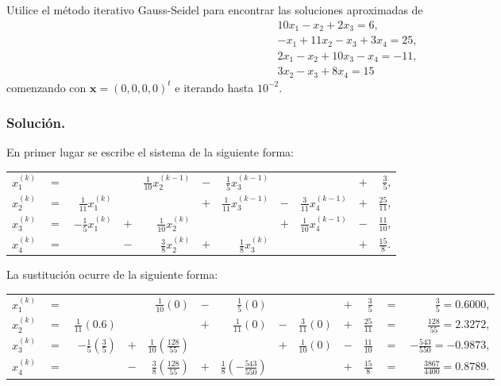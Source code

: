 \begin{exerciseT}
Utilice el método iterativo Gauss-Seidel para encontrar las soluciones aproximadas de
$$\begin{array}{r}
    10x_1 - x_2 + 2x_3 = 6,\\
    -x_1 + 11x_2 - x_3 + 3x_4 = 25,\\
    2x_1 - x_2 + 10x_3 - x_4 = -11,\\
    3x_2 - x_3 + 8x_4 = 15
  \end{array}$$
comenzando con $\textbf{x}=(0,0,0,0)^t$ e iterando hasta $10^{-2}$.

\subsubsection*{Solución.}
En primer lugar se escribe el sistema de la siguiente forma:
\begin{table}[H]
	\centering
	\begin{tabular}{lcrcrcrcrcr}
    	$x_1^{(k)}$ & $=$ &  &  & $\frac{1}{10}x_2^{(k-1)}$ & $-$ & $\frac{1}{5}x_3^{(k-1)}$ & & & $+$ & $\frac{3}{5}$,\\
	    $x_2^{(k)}$ & $=$ & $\frac{1}{11}x_1^{(k)}$ &  &  & $+$ & $\frac{1}{11}x_3^{(k-1)}$ & $-$ & $\frac{3}{11}x_4^{(k-1)}$ & $+$ & $\frac{25}{11}$,\\
    	$x_3^{(k)}$ & $=$ & $-\frac{1}{5}x_1^{(k)}$ & $+$ & $\frac{1}{10}x_2^{(k)}$ & & & $+$ & $\frac{1}{10}x_4^{(k-1)}$ & $-$ & $\frac{11}{10}$,\\
	    $x_4^{(k)}$ & $=$ &  & $-$ & $\frac{3}{8}x_2^{(k)}$ & $+$ & $\frac{1}{8}x_3^{(k)}$ & & & $+$ & $\frac{15}{8}$.\\
  	\end{tabular}
\end{table}

La sustitución ocurre de la siguiente forma:
\begin{table}[H]
	\centering
	\begin{tabular}{lcrcrcrcrcrcr}
    	$x_1^{(k)}$ & $=$ &  &  & $\frac{1}{10}(0)$ & $-$ & $\frac{1}{5}(0)$ & & & $+$ & $\frac{3}{5}$ & $=$ & $\frac{3}{5} = 0.6000$,\\
    	$x_2^{(k)}$ & $=$ & $\frac{1}{11}(0.6)$ &  &  & $+$ & $\frac{1}{11}(0)$ & $-$ & $\frac{3}{11}(0)$ & $+$ & $\frac{25}{11}$ & $=$ 
    	& $\frac{128}{55}=2.3272$,\\
	    $x_3^{(k)}$ & $=$ & $-\frac{1}{5}(\frac{3}{5})$ & $+$ & $\frac{1}{10}(\frac{128}{55})$ & & & $+$ & $\frac{1}{10}(0)$ & $-$ 
	    & $\frac{11}{10}$ & $=$ & $-\frac{543}{550} = -0.9873$,\\
	    $x_4^{(k)}$ & $=$ &  & $-$ & $\frac{3}{8}(\frac{128}{55})$ & $+$ & $\frac{1}{8}(-\frac{543}{550})$ & & & $+$ & $\frac{15}{8}$ & $=$ 
	    & $\frac{3867}{4400} = 0.8789$.\\
  \end{tabular}
\end{table}


\end{exerciseT}
